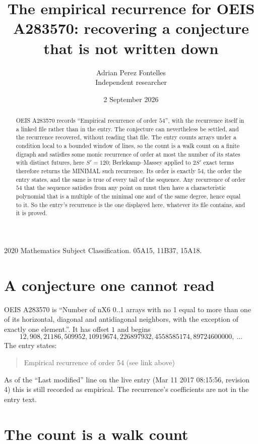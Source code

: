 \documentclass[11pt,a4paper]{article}
\title{The empirical recurrence for OEIS A283570: recovering a conjecture that is not written down}
\author{Adrian Perez Fontelles\\ \small Independent researcher}
\date{2 September 2026}
\theoremstyle{plain}
\theoremstyle{definition}
\begin{document}
\maketitle

\begin{abstract}
OEIS A283570 records ``Empirical recurrence of order $54$'', with the recurrence itself in a
linked file rather than in the entry. The conjecture can nevertheless be settled, and the
recurrence recovered, without reading that file. The entry counts arrays under a condition
local to a bounded window of lines, so the count is a walk count on a finite digraph and
satisfies some monic recurrence of order at most the number of its states with distinct
futures, here $S'=120$; Berlekamp--Massey applied to $2S'$ exact
terms therefore returns the MINIMAL such recurrence. Its order is exactly $54$, the order
the entry states, and the same is true of every tail of the sequence. Any recurrence of order
$54$ that the sequence satisfies from any point on must then have a characteristic
polynomial that is a multiple of the minimal one and of the same degree, hence equal to it. So
the entry's recurrence is the one displayed here, whatever its file contains, and it is
proved.
\end{abstract}

\noindent\small 2020 Mathematics Subject Classification. 05A15, 11B37, 15A18.\normalsize

\section{A conjecture one cannot read}

OEIS A283570 is ``Number of nX6 0..1 arrays with no 1 equal to more than one of its horizontal, diagonal and antidiagonal neighbors, with the exception of exactly one element.''. It has offset $1$ and begins
\[
12, 908, 21186, 509952, 10919674, 226897932, 4558585174, 89724600000,\ \dots
\]
The entry states:
\begin{quote}
Empirical recurrence of order 54 (see link above)
\end{quote}
As of the ``Last modified'' line on the live entry (Mar 11 2017 08:15:56, revision 4) this is still
recorded as empirical. The recurrence's coefficients are not in the entry text.

\section{The count is a walk count}
\end{document}
